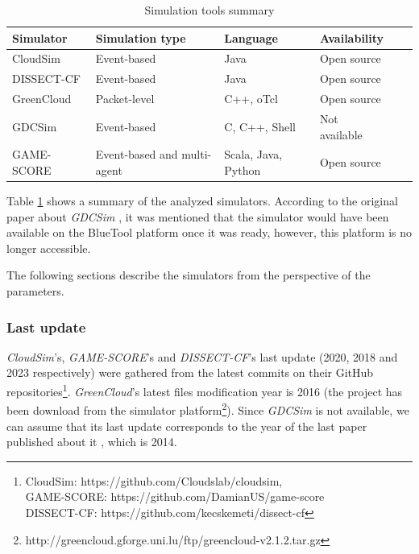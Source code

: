 {\begin{table}
    \caption{Simulation tools summary}\label{tab:comparison}
    \begin{tabular}{|l|l|l|l|l|l|}
      \hline
      Simulator  & Simulation type             & Language            & Availability  \\
      \hline
      CloudSim   & Event-based                 & Java                & Open source   \\
      DISSECT-CF & Event-based                 & Java                & Open source   \\
      GreenCloud & Packet-level                & C++, oTcl           & Open source   \\
      GDCSim     & Event-based                 & C, C++, Shell       & Not available \\
      GAME-SCORE & Event-based and multi-agent & Scala, Java, Python & Open source   \\
      \hline
    \end{tabular}
\end{table}
Table \ref{tab:comparison} shows a summary of the analyzed simulators. According to the original paper about \emph{GDCSim} \cite{gupta2011gdcsim}, it was mentioned that the simulator would have been available on the BlueTool platform once it was ready, however, this platform is no longer accessible.

The following sections describe the simulators from the perspective of the parameters.

\subsubsection{Last update}
\emph{CloudSim}'s, \emph{GAME-SCORE}'s and \emph{DISSECT-CF}'s last update (2020, 2018 and 2023 respectively) were gathered from the latest commits on their GitHub repositories\footnote{CloudSim: https://github.com/Cloudslab/cloudsim,\\ GAME-SCORE: https://github.com/DamianUS/game-score \\ DISSECT-CF: https://github.com/kecskemeti/dissect-cf}. \emph{GreenCloud}'s latest files modification year is 2016 (the project has been download from the simulator platform\footnote{http://greencloud.gforge.uni.lu/ftp/greencloud-v2.1.2.tar.gz}). Since \emph{GDCSim} is not available, we can assume that its last update corresponds to the year of the last paper published about it \cite{gdcsim_latest}, which is 2014.

}
